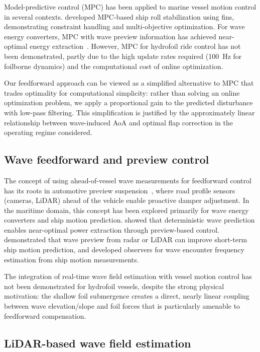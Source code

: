 \documentclass[review]{elsarticle}
\begin{document}
Model-predictive control (MPC) has been applied to marine vessel
motion control in several contexts.
\citet{perez2012} developed MPC-based ship roll stabilization
using fins, demonstrating constraint handling and multi-objective
optimization.
For wave energy converters, MPC with wave preview information
has achieved near-optimal energy extraction~\citep{korde2015}.
However, MPC for hydrofoil ride control has not been demonstrated,
partly due to the high update rates required (100~Hz for foilborne
dynamics) and the computational cost of online optimization.

Our feedforward approach can be viewed as a simplified alternative
to MPC that trades optimality for computational simplicity: rather
than solving an online optimization problem, we apply a proportional
gain to the predicted disturbance with low-pass filtering.
This simplification is justified by the approximately linear
relationship between wave-induced AoA and optimal flap correction
in the operating regime considered.

\subsection{Wave feedforward and preview control}

The concept of using ahead-of-vessel wave measurements for
feedforward control has its roots in automotive preview
suspension~\citep{hrovat1997}, where road profile sensors
(cameras, LiDAR) ahead of the vehicle enable proactive damper
adjustment.
In the maritime domain, this concept has been explored primarily
for wave energy converters and ship motion prediction.
\citet{korde2015} showed that deterministic wave prediction enables
near-optimal power extraction through preview-based control.
\citet{cummins2017} demonstrated that wave preview
from radar or LiDAR can improve short-term ship motion prediction,
and \citet{belleter2015} developed observers for wave encounter
frequency estimation from ship motion measurements.

The integration of real-time wave field estimation with
vessel motion control has not been demonstrated for hydrofoil
vessels, despite the strong physical motivation: the shallow foil
submergence creates a direct, nearly linear coupling between wave
elevation/slope and foil forces that is particularly amenable to
feedforward compensation.

\subsection{LiDAR-based wave field estimation}
\end{document}
